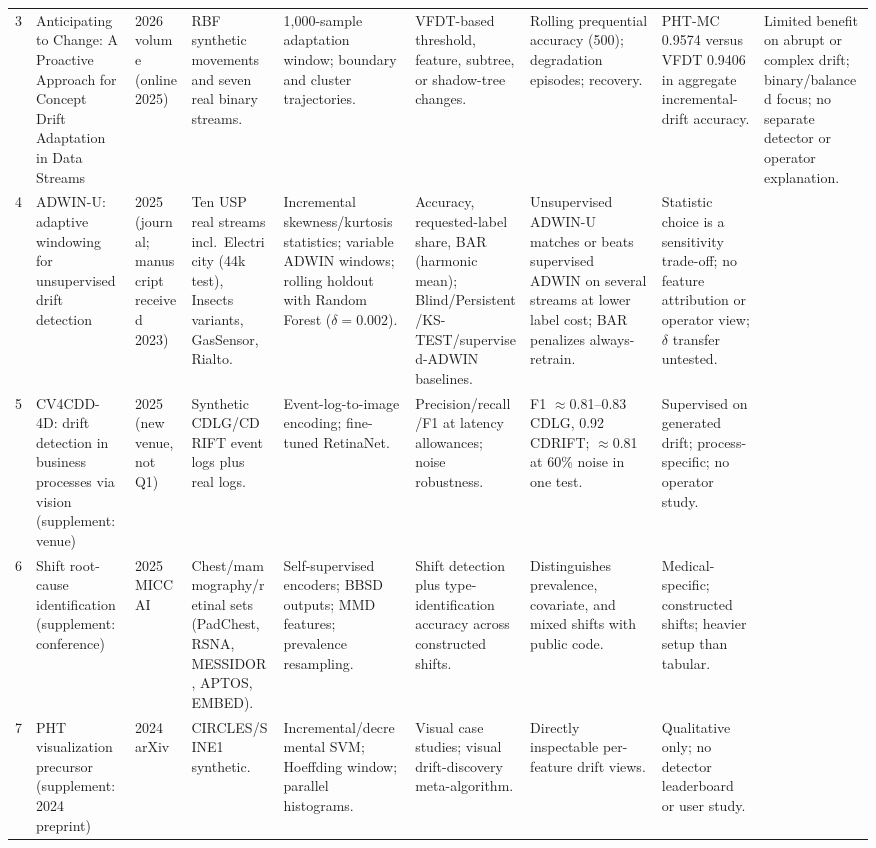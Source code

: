 \documentclass[10pt,a4paper]{article}
\begin{document}
\begin{landscape}
\begin{longtable}{L{0.45cm}L{3.05cm}L{1.15cm}L{2.95cm}L{3.05cm}L{2.95cm}L{2.95cm}L{3.0cm}L{3.95cm}}
3 & Anticipating to Change: A Proactive Approach for Concept Drift Adaptation in Data Streams & 2026 volume (online 2025) & RBF synthetic movements and seven real binary streams. & 1,000-sample adaptation window; boundary and cluster trajectories. & VFDT-based threshold, feature, subtree, or shadow-tree changes. & Rolling prequential accuracy (500); degradation episodes; recovery. & PHT-MC 0.9574 versus VFDT 0.9406 in aggregate incremental-drift accuracy. & Limited benefit on abrupt or complex drift; binary/balanced focus; no separate detector or operator explanation.\\[5pt]
4 & ADWIN-U: adaptive windowing for unsupervised drift detection & 2025 (journal; manuscript received 2023) & Ten USP real streams incl.\ Electricity (44k test), Insects variants, GasSensor, Rialto. & Incremental skewness/kurtosis statistics; variable ADWIN windows; rolling holdout with Random Forest ($\delta=0.002$). & Accuracy, requested-label share, BAR (harmonic mean); Blind/Persistent/KS-TEST/supervised-ADWIN baselines. & Unsupervised ADWIN-U matches or beats supervised ADWIN on several streams at lower label cost; BAR penalizes always-retrain. & Statistic choice is a sensitivity trade-off; no feature attribution or operator view; $\delta$ transfer untested.\\[5pt]
5 & CV4CDD-4D: drift detection in business processes via vision (supplement: venue) & 2025 (new venue, not Q1) & Synthetic CDLG/CDRIFT event logs plus real logs. & Event-log-to-image encoding; fine-tuned RetinaNet. & Precision/recall/F1 at latency allowances; noise robustness. & F1 $\approx$0.81--0.83 CDLG, 0.92 CDRIFT; $\approx$0.81 at 60\% noise in one test. & Supervised on generated drift; process-specific; no operator study.\\[5pt]
6 & Shift root-cause identification (supplement: conference) & 2025 MICCAI & Chest/mammography/retinal sets (PadChest, RSNA, MESSIDOR, APTOS, EMBED). & Self-supervised encoders; BBSD outputs; MMD features; prevalence resampling. & Shift detection plus type-identification accuracy across constructed shifts. & Distinguishes prevalence, covariate, and mixed shifts with public code. & Medical-specific; constructed shifts; heavier setup than tabular.\\[5pt]
7 & PHT visualization precursor (supplement: 2024 preprint) & 2024 arXiv & CIRCLES/SINE1 synthetic. & Incremental/decremental SVM; Hoeffding window; parallel histograms. & Visual case studies; visual drift-discovery meta-algorithm. & Directly inspectable per-feature drift views. & Qualitative only; no detector leaderboard or user study.\\[5pt]

\end{longtable}
\end{landscape}
\end{document}
